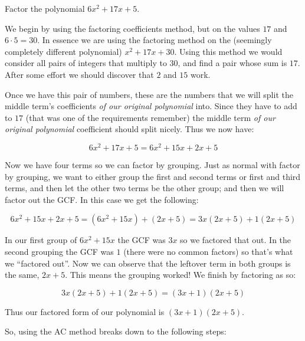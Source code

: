 \documentclass{ximera}
\begin{document}
\begin{example}
    Factor the polynomial $6x^2 + 17x + 5$.
    
    \begin{explanation}
        We begin by using the factoring coefficients method, but on the values $17$ and $6 \cdot 5 = 30$. In essence we are using the factoring method on the (seemingly completely different polynomial) $x^2 + 17x + 30$. Using this method we would consider all pairs of integers that multiply to $30$, and find a pair whose sum is $17$. After some effort we should discover that $2$ and $15$ work.
        
        Once we have this pair of numbers, these are the numbers that we will split the middle term's coefficients \textit{of our original polynomial} into. Since they have to add to $17$ (that was one of the requirements remember) the middle term \textit{of our original polynomial} coefficient should split nicely. Thus we now have:
        
        \[
            6x^2 + 17x + 5 = 6x^2 + 15x + 2x + 5
        \]
        
        Now we have four terms so we can factor by grouping. Just as normal with factor by grouping, we want to either group the first and second terms or first and third terms, and then let the other two terms be the other group; and then we will factor out the GCF. In this case we get the following:
        
        \[
            6x^2 + 15x + 2x + 5 = (6x^2 + 15x) + (2x + 5) = 3x(2x + 5) + 1(2x + 5)
        \]
        
        In our first group of $6x^2 + 15x$ the GCF was $3x$ so we factored that out. In the second grouping the GCF was $1$ (there were no common factors) so that's what we ``factored out''. Now we can observe that the leftover term in both groups is the same, $2x + 5$. This means the grouping worked! We finish by factoring as so:
        
        \[
            3x(2x + 5) + 1(2x + 5) = (3x + 1)(2x + 5)
        \]
        
        Thus our factored form of our polynomial is $(3x + 1)(2x + 5)$.
    \end{explanation}
\end{example}

So, using the AC method breaks down to the following steps:
\end{document}
